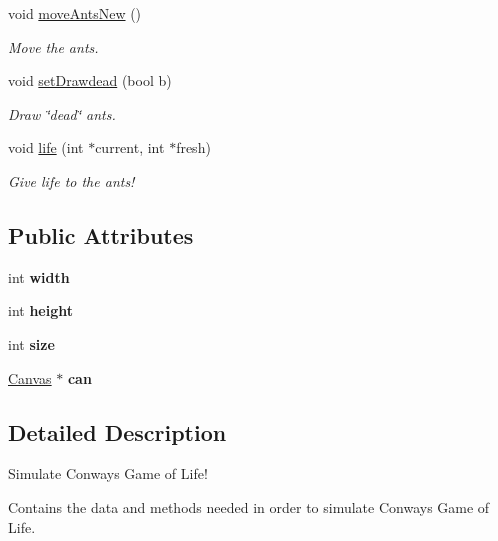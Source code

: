 \begin{DoxyCompactItemize}
void \hyperlink{class_life_farm_ab4dfccfcf0cb2ac83466223b8bb4c237}{move\+Ants\+New} ()
\begin{DoxyCompactList}\small\item\em Move the ants. \end{DoxyCompactList}\item 
void \hyperlink{class_life_farm_a90d784b157199edccf818ce3524a061a}{set\+Drawdead} (bool b)
\begin{DoxyCompactList}\small\item\em Draw \char`\"{}dead\char`\"{} ants. \end{DoxyCompactList}\item 
void \hyperlink{class_life_farm_aa23a45af1c6a7fd82d7fcca51d864487}{life} (int $\ast$current, int $\ast$fresh)
\begin{DoxyCompactList}\small\item\em Give life to the ants! \end{DoxyCompactList}\end{DoxyCompactItemize}
\subsection*{Public Attributes}
\begin{DoxyCompactItemize}
\item 
\mbox{\label{class_life_farm_a2f484e44dc4df664a5f9a32761a19af9}} 
int {\bfseries width}
\item 
\mbox{\label{class_life_farm_a63e58d91a3f7aee59886f89fd0230c2d}} 
int {\bfseries height}
\item 
\mbox{\label{class_life_farm_a1ef07c284a5a6c09670824a1feb258a0}} 
int {\bfseries size}
\item 
\mbox{\label{class_life_farm_a06cc91dafd92d6487e416cbec539df38}} 
\hyperlink{classtsgl_1_1_canvas}{Canvas} $\ast$ {\bfseries can}
\end{DoxyCompactItemize}


\subsection{Detailed Description}
Simulate Conway\textquotesingle{}s Game of Life! 

Contains the data and methods needed in order to simulate Conway\textquotesingle{}s Game of Life.

